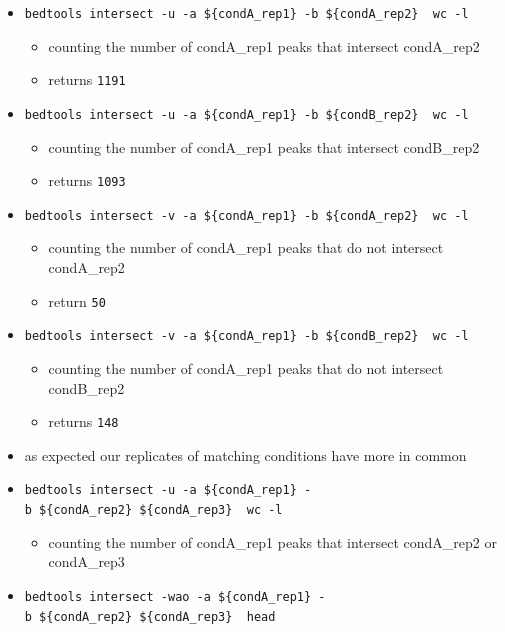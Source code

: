 \documentclass[
]{book}
\providecommand{\tightlist}{%
  \setlength{\itemsep}{0pt}\setlength{\parskip}{0pt}}
\begin{document}
\begin{itemize}
\tightlist
\item
  \texttt{bedtools\ intersect\ -u\ -a\ \$\{condA\_rep1\}\ -b\ \$\{condA\_rep2\}\ \textbar{}\ wc\ -l}

  \begin{itemize}
  \tightlist
  \item
    counting the number of condA\_rep1 peaks that intersect condA\_rep2
  \item
    returns \texttt{1191}
  \end{itemize}
\item
  \texttt{bedtools\ intersect\ -u\ -a\ \$\{condA\_rep1\}\ -b\ \$\{condB\_rep2\}\ \textbar{}\ wc\ -l}

  \begin{itemize}
  \tightlist
  \item
    counting the number of condA\_rep1 peaks that intersect condB\_rep2
  \item
    returns \texttt{1093}
  \end{itemize}
\item
  \texttt{bedtools\ intersect\ -v\ -a\ \$\{condA\_rep1\}\ -b\ \$\{condA\_rep2\}\ \textbar{}\ wc\ -l}

  \begin{itemize}
  \tightlist
  \item
    counting the number of condA\_rep1 peaks that do not intersect condA\_rep2
  \item
    return \texttt{50}
  \end{itemize}
\item
  \texttt{bedtools\ intersect\ -v\ -a\ \$\{condA\_rep1\}\ -b\ \$\{condB\_rep2\}\ \textbar{}\ wc\ -l}

  \begin{itemize}
  \tightlist
  \item
    counting the number of condA\_rep1 peaks that do not intersect condB\_rep2
  \item
    returns \texttt{148}
  \end{itemize}
\item
  as expected our replicates of matching conditions have more in common
\item
  \texttt{bedtools\ intersect\ -u\ -a\ \$\{condA\_rep1\}\ -b\ \$\{condA\_rep2\}\ \$\{condA\_rep3\}\ \textbar{}\ wc\ -l}

  \begin{itemize}
  \tightlist
  \item
    counting the number of condA\_rep1 peaks that intersect condA\_rep2 or condA\_rep3
  \end{itemize}
\item
  \texttt{bedtools\ intersect\ -wao\ -a\ \$\{condA\_rep1\}\ -b\ \$\{condA\_rep2\}\ \$\{condA\_rep3\}\ \textbar{}\ head}


\end{itemize}
\end{document}
